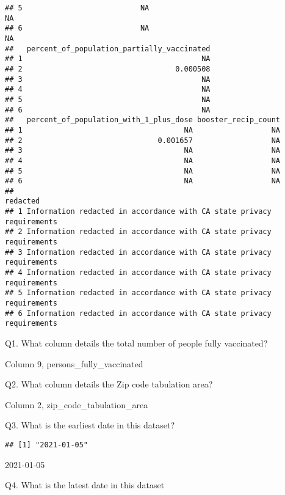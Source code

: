 \documentclass[
]{article}
\newenvironment{Shaded}{\begin{snugshade}}{\end{snugshade}}
\newcommand{\FunctionTok}[1]{\textcolor[rgb]{0.00,0.00,0.00}{#1}}
\newcommand{\NormalTok}[1]{#1}
\newcommand{\SpecialCharTok}[1]{\textcolor[rgb]{0.00,0.00,0.00}{#1}}
\begin{document}
\begin{verbatim}
## 5                           NA                                     NA
## 6                           NA                                     NA
##   percent_of_population_partially_vaccinated
## 1                                         NA
## 2                                   0.000508
## 3                                         NA
## 4                                         NA
## 5                                         NA
## 6                                         NA
##   percent_of_population_with_1_plus_dose booster_recip_count
## 1                                     NA                  NA
## 2                               0.001657                  NA
## 3                                     NA                  NA
## 4                                     NA                  NA
## 5                                     NA                  NA
## 6                                     NA                  NA
##                                                                redacted
## 1 Information redacted in accordance with CA state privacy requirements
## 2 Information redacted in accordance with CA state privacy requirements
## 3 Information redacted in accordance with CA state privacy requirements
## 4 Information redacted in accordance with CA state privacy requirements
## 5 Information redacted in accordance with CA state privacy requirements
## 6 Information redacted in accordance with CA state privacy requirements
\end{verbatim}

Q1. What column details the total number of people fully vaccinated?

Column 9, persons\_fully\_vaccinated

Q2. What column details the Zip code tabulation area?

Column 2, zip\_code\_tabulation\_area

Q3. What is the earliest date in this dataset?

\begin{Shaded}
\end{Shaded}

\begin{verbatim}
## [1] "2021-01-05"
\end{verbatim}

2021-01-05

Q4. What is the latest date in this dataset
\end{document}
